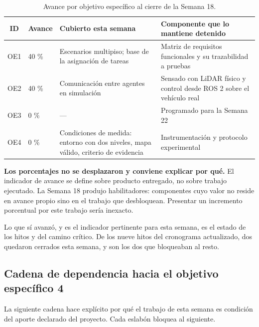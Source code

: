 \documentclass[12pt,letterpaper]{article}
\begin{document}
\begin{table}[H]
    \centering
    \small
    \caption{Avance por objetivo específico al cierre de la Semana 18.}
    \label{tab:objetivos}
    \begin{tabular}{@{}cp{2.0cm}p{4.4cm}p{5.2cm}@{}}
        \toprule
        \textbf{ID} & \textbf{Avance} & \textbf{Cubierto esta semana} & \textbf{Componente que lo mantiene detenido} \\ \midrule
        OE1 & 40 \% & Escenarios multipiso; base de la asignación de tareas & Matriz de requisitos funcionales y su trazabilidad a pruebas \\ \addlinespace
        OE2 & 40 \% & Comunicación entre agentes en simulación & Sensado con LiDAR físico y control desde ROS 2 sobre el vehículo real \\ \addlinespace
        OE3 & 0 \%  & --- & Programado para la Semana 22 \\ \addlinespace
        OE4 & 0 \%  & Condiciones de medida: entorno con dos niveles, mapa válido, criterio de evidencia & Instrumentación y protocolo experimental \\ \bottomrule
    \end{tabular}
\end{table}

\textbf{Los porcentajes no se desplazaron y conviene explicar por qué.} El indicador de avance se define sobre producto entregado, no sobre trabajo ejecutado. La Semana 18 produjo habilitadores: componentes cuyo valor no reside en avance propio sino en el trabajo que desbloquean. Presentar un incremento porcentual por este trabajo sería inexacto.

Lo que sí avanzó, y es el indicador pertinente para esta semana, es el estado de los hitos y del camino crítico. De los nueve hitos del cronograma actualizado, dos quedaron cerrados esta semana, y son los dos que bloqueaban al resto.

\subsection{Cadena de dependencia hacia el objetivo específico 4}

La siguiente cadena hace explícito por qué el trabajo de esta semana es condición del aporte declarado del proyecto. Cada eslabón bloquea al siguiente.
\end{document}
